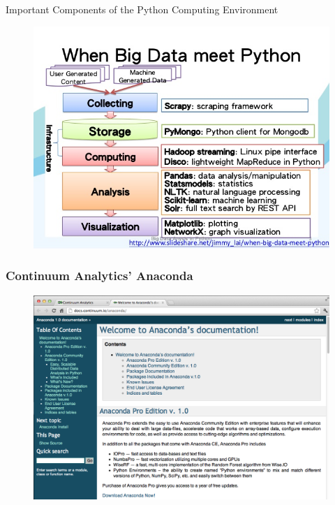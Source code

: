 \documentclass[MASTER.tex]{subfiles}
\begin{document}
 
\begin{frame}
\huge
Important Components of the Python Computing Environment
\end{frame}
\begin{frame}
	\begin{figure}
\centering
\includegraphics[width=0.99\linewidth]{flowchart}

\end{figure}

\end{frame}
\begin{frame}
	\frametitle{Continuum Analytics’ Anaconda}
	\begin{figure}
\centering
\includegraphics[width=1.0\linewidth]{anaconda.png}

\end{figure}

\end{frame}
\end{document}
